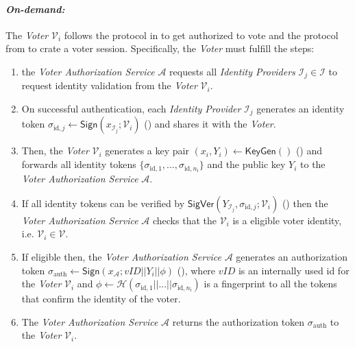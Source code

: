 \paragraph{\textit{On-demand:}}
The \textit{Voter} $\mathcal{V}_i$ follows the protocol in  to get authorized to vote and the protocol from  to crate a voter session. Specifically, the \textit{Voter} must fulfill the steps:
\begin{enumerate}
    \item the \textit{Voter Authorization Service} $\mathcal{A}$ requests all \textit{Identity Providers} $\mathcal{I}_j \in \boldsymbol{\mathcal{I}}$ to request identity validation from the \textit{Voter} $\mathcal{V}_i$.
    
    \item On successful authentication, each \textit{Identity Provider} $\mathcal{I}_j$ generates an identity token $\sigma_{\mathrm{id}, j} \leftarrow \mathsf{Sign}(x_{\mathcal{I}_j}; \mathcal{V}_i)$ () and shares it with the \textit{Voter}.
    
    \item Then, the \textit{Voter} $\mathcal{V}_i$ generates a key pair \( (x_i, Y_i) \leftarrow \mathsf{KeyGen}() \) () and forwards all identity tokens \( \{\sigma_{\mathrm{id}, 1}, ..., \sigma_{\mathrm{id}, n_\mathrm{i}}\} \) and the public key $Y_i$ to the \textit{Voter Authorization Service} $\mathcal{A}$.
    
    \item If all identity tokens can be verified by \( \mathsf{SigVer} (Y_{\mathcal{I}_j}, \sigma_{\mathrm{id}, j}; \mathcal{V}_i) \) () then the \textit{Voter Authorization Service} $\mathcal{A}$ checks that the $\mathcal{V}_i$ is a eligible voter identity, i.e. \( \mathcal{V}_i \in \boldsymbol{\mathcal{V}} \).
    
    \item If eligible then, the \textit{Voter Authorization Service} $\mathcal{A}$ generates an authorization token $\sigma_\mathrm{auth} \leftarrow \mathsf{Sign}(x_\mathcal{A}; vID || Y_i || \phi)$ (), where $vID$ is an internally used id for the \textit{Voter} $\mathcal{V}_i$ and $\phi \leftarrow \mathcal{H}(\sigma_{\mathrm{id}, 1} || ... || \sigma_{\mathrm{id}, n_\mathrm{i}})$ is a fingerprint to all the tokens that confirm the identity of the voter.
    
    \item The \textit{Voter Authorization Service} $\mathcal{A}$ returns the authorization token $\sigma_\mathrm{auth}$ to the \textit{Voter} $\mathcal{V}_i$.
    

\end{enumerate}

